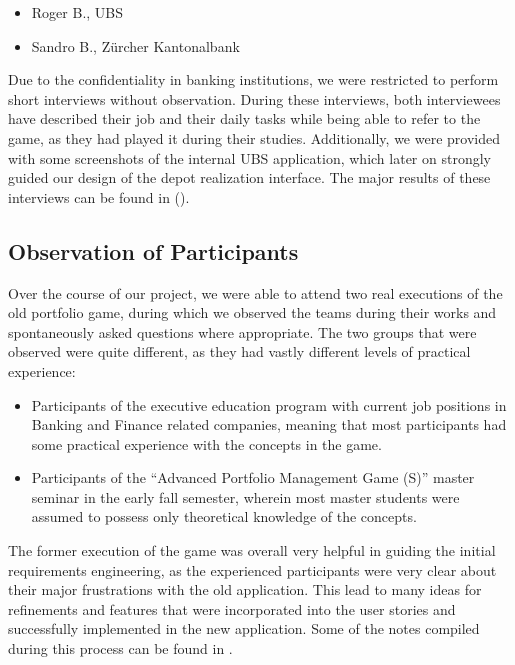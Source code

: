 \begin{itemize}
  \item Roger B., UBS
  \item Sandro B., Zürcher Kantonalbank
\end{itemize}

Due to the confidentiality in banking institutions, we were restricted to perform short interviews without observation. During these interviews, both interviewees have described their job and their daily tasks while being able to refer to the game, as they had played it during their studies. Additionally, we were provided with some screenshots of the internal UBS application, which later on strongly guided our design of the depot realization interface. The major results of these interviews can be found in ().


\subsection{Observation of Participants}
Over the course of our project, we were able to attend two real executions of the old portfolio game, during which we observed the teams during their works and spontaneously asked questions where appropriate. The two groups that were observed were quite different, as they had vastly different levels of practical experience:

\begin{itemize}
  \item Participants of the executive education program with current job positions in Banking and Finance related companies, meaning that most participants had some practical experience with the concepts in the game.
  \item Participants of the ``Advanced Portfolio Management Game (S)'' master seminar in the early fall semester, wherein most master students were assumed to possess only theoretical knowledge of the concepts.
\end{itemize}

The former execution of the game was overall very helpful in guiding the initial requirements engineering, as the experienced participants were very clear about their major frustrations with the old application. This lead to many ideas for refinements and features that were incorporated into the user stories and successfully implemented in the new application. Some of the notes compiled during this process can be found in .

